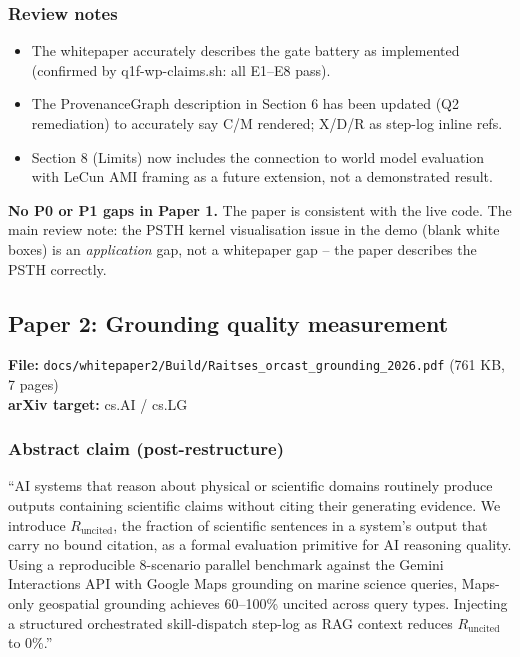 \subsubsection{Review notes}

\begin{itemize}
\item The whitepaper accurately describes the gate battery as implemented (confirmed by q1f-wp-claims.sh: all E1--E8 pass).
\item The ProvenanceGraph description in Section 6 has been updated (Q2 remediation) to accurately say C/M rendered; X/D/R as step-log inline refs.
\item Section 8 (Limits) now includes the connection to world model evaluation with LeCun AMI framing as a future extension, not a demonstrated result.
\end{itemize}

\begin{notebox}
\textbf{No P0 or P1 gaps in Paper 1.} The paper is consistent with the live code. The main review note: the PSTH kernel visualisation issue in the demo (blank white boxes) is an \textit{application} gap, not a whitepaper gap -- the paper describes the PSTH correctly.
\end{notebox}

\subsection{Paper 2: Grounding quality measurement}

\textbf{File:} \texttt{docs/whitepaper2/Build/Raitses\_orcast\_grounding\_2026.pdf} (761 KB, 7 pages)\\
\textbf{arXiv target:} cs.AI / cs.LG

\subsubsection{Abstract claim (post-restructure)}

``AI systems that reason about physical or scientific domains routinely produce outputs containing scientific claims without citing their generating evidence. We introduce $R_\text{uncited}$, the fraction of scientific sentences in a system's output that carry no bound citation, as a formal evaluation primitive for AI reasoning quality. Using a reproducible 8-scenario parallel benchmark against the Gemini Interactions API with Google Maps grounding on marine science queries, Maps-only geospatial grounding achieves 60--100\% uncited across query types. Injecting a structured orchestrated skill-dispatch step-log as RAG context reduces $R_\text{uncited}$ to 0\%.''

